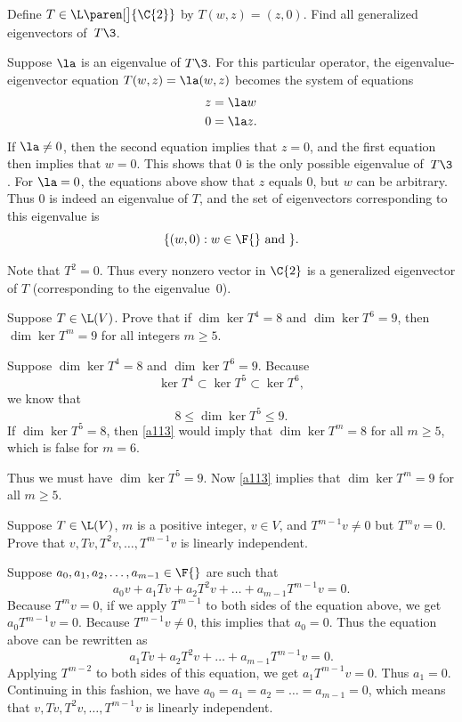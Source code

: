 
\exercise
Define $T \in \L\paren[\big]{\C{2}}$ by
$
T(w,z) = (z,0)$.
Find all generalized eigenvectors of~$T\3$.

\begin{Solution}
Suppose $\la$ is an eigenvalue of $T\3$.
For this particular operator, the eigenvalue-eigenvector equation
$T(w,z) = \la (w, z)$ becomes the system of equations
\begin{align*}
z &= \la w \\
0 &= \la z.
\end{align*}
If $\la \ne 0$, then the second equation implies that $z = 0$, and the first
equation then implies that $w = 0$.  This shows that $0$ is the only possible eigenvalue of~$T\3$.  For
$\la = 0$, the equations above show that $z$ equals $0$, but $w$ can be
arbitrary.  Thus $0$ is indeed an eigenvalue of $T$, and the set of eigenvectors
corresponding to this eigenvalue is
\[
\{(w, 0) : w \in \F{} \text{\ and\ }\}.
\]

Note that $T^2 = 0$.  Thus every nonzero vector in $\C{2}$ is a generalized eigenvector of
$T$ (corresponding to the eigenvalue~$0$).
\end{Solution}

\exercise
Suppose $T \in \L(V)$. Prove that if $\dim \ker T^4 = 8$ and $\dim \ker T^6 = 9$, then $\dim \ker T^m = 9$ for all integers $m \ge 5$.

\begin{Solution}
Suppose $\dim \ker T^4 = 8$ and $\dim \ker T^6 = 9$. Because
\[
\ker T^4 \subset \ker T^5 \subset \ker T^6,
\]
we know that
\[
8 \le \dim \ker T^5 \le 9.
\]
If $\dim \ker T^5 = 8$, then \ref{a113} would imply that $\dim \ker T^m = 8$ for all $m\ge 5$, which is false for $m = 6$.

Thus we must have $\dim \ker T^5 = 9$. Now \ref{a113} implies that $\dim \ker T^m = 9$ for all $m\ge 5$.
\end{Solution}

\exercise
Suppose $T \in \L(V)$, $m$ is a positive integer, $v \in V$, and
$T^{m-1} v \ne 0$ but $T^m v = 0$.  Prove that
$
v, Tv, T^2 v, \dots, T^{m-1} v
$
is linearly independent.

\begin{Solution}
Suppose $a_0, a_1, a_2, \dots, a_{m-1} \in \F{}$ are such that
\[
a_0 v + a_1 Tv + a_2 T^2 v + \dots + a_{m-1}T^{m-1} v = 0.
\]
Because $T^m v = 0$, if we apply $T^{m-1}$ to both sides of the equation above,
we get $a_0 T^{m-1} v = 0$.  Because $T^{m-1} v \ne 0$, this implies
that $a_0 = 0$.  Thus the equation above can be rewritten as
\[
a_1 Tv + a_2 T^2 v + \dots + a_{m-1}T^{m-1} v = 0.
\]
Applying $T^{m-2}$ to both sides of this equation, we get $a_1 T^{m-1} v = 0$.
Thus $a_1 = 0$.  Continuing in this fashion, we have
$a_0 = a_1 = a_2 = \dots = a_{m-1} = 0$, which means that
$v, Tv, T^2 v, \dots, T^{m-1} v$ is linearly independent.
\end{Solution}

